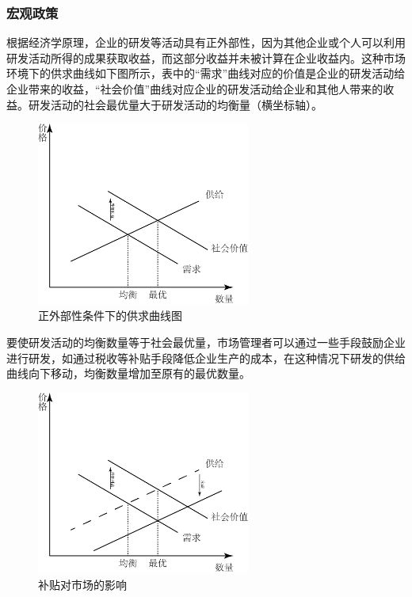 \documentclass[twocolumn]{ctexbook}
\begin{document}
			\subsubsection{宏观政策}
			
			根据经济学原理，企业的研发等活动具有正外部性，因为其他企业或个人可以利用研发活动所得的成果获取收益，而这部分收益并未被计算在企业收益内。这种市场环境下的供求曲线如下图所示，表中的“需求”曲线对应的价值是企业的研发活动给企业带来的收益，“社会价值”曲线对应企业的研发活动给企业和其他人带来的收益。研发活动的社会最优量大于研发活动的均衡量（横坐标轴）\citep{RN29}。
			\begin{figure}[ht]
				\centering
				\includegraphics[width=7cm]{fig5.png} %
				\caption{正外部性条件下的供求曲线图}
				\label{fig:fig5}
			\end{figure}
			
			要使研发活动的均衡数量等于社会最优量，市场管理者可以通过一些手段鼓励企业进行研发，如通过税收等补贴手段降低企业生产的成本，在这种情况下研发的供给曲线向下移动，均衡数量增加至原有的最优数量\citep{RN14}。
			
			\begin{figure}[ht]
				\centering
				\includegraphics[width=7cm]{fig6.png} %
				\caption{补贴对市场的影响}
				\label{fig:fig6}
			\end{figure}
			
\end{document}
